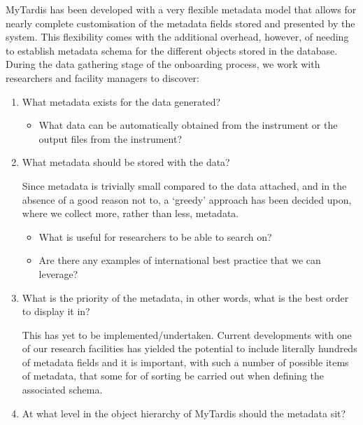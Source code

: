 \documentclass[letterpaper,10pt,english]{sphinxmanual}
\begin{document}
\sphinxAtStartPar
MyTardis has been developed with a very flexible metadata model that allows for nearly complete customisation of the metadata fields stored and presented by the system. This flexibility comes with the additional overhead, however, of needing to establish metadata schema for the different objects stored in the database. During the data gathering stage of the onboarding process, we work with researchers and facility managers to discover:
\begin{enumerate}
%
\item {} 
\sphinxAtStartPar
What metadata exists for the data generated?
\begin{itemize}
\item {} 
\sphinxAtStartPar
What data can be automatically obtained from the instrument or the output files from the instrument?

\end{itemize}

\item {} 
\sphinxAtStartPar
What metadata should be stored with the data? %
\begin{footnote}[2]\sphinxAtStartFootnote
Since metadata is trivially small compared to the data attached, and in the absence of a good reason not to, a ‘greedy’ approach has been decided upon, where we collect more, rather than less, metadata.
%
\end{footnote}
\begin{itemize}
\item {} 
\sphinxAtStartPar
What is useful for researchers to be able to search on?

\item {} 
\sphinxAtStartPar
Are there any examples of international best practice that we can leverage?

\end{itemize}

\item {} 
\sphinxAtStartPar
What is the priority of the metadata, in other words, what is the best order to display it in? %
\begin{footnote}[3]\sphinxAtStartFootnote
This has yet to be implemented/undertaken. Current developments with one of our research facilities has yielded the potential to include literally hundreds of metadata fields and it is important, with such a number of possible items of metadata, that some for of sorting be carried out when defining the associated schema.
%
\end{footnote}

\item {} 
\sphinxAtStartPar
At what level in the object hierarchy of MyTardis should the metadata sit?

\end{enumerate}
\end{document}
